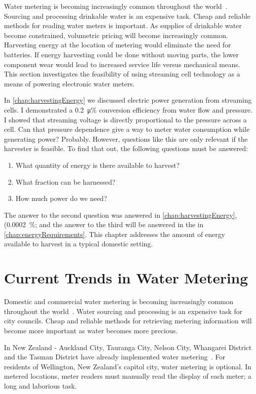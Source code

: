 
Water metering is becoming increasingly common throughout the world~\cite{Chang2012}.
Sourcing and processing drinkable water is an expensive task.
Cheap and reliable methods for reading water meters is important.
As supplies of drinkable water become constrained, volumetric pricing will become increasingly common.
Harvesting energy at the location of metering would eliminate the need for batteries.
If energy harvesting could be done without moving parts, the lower component wear would lead to increased service life versus mechanical means.
This section investigates the feasibility of using streaming cell technology as a means of powering electronic water meters.

In \cref{chap:harvestingEnergy} we discussed electric power generation from streaming cells.
I demonstrated a \SI{0.2}{\micro\percent} conversion efficiency from water flow and pressure.
I showed that streaming voltage is directly proportional to the pressure across a cell.
Can that pressure dependence give a way to meter water consumption while generating power? Probably.
However, questions like this are only relevant if the harvester is feasible.
To find that out, the following questions must be answered:
\begin{enumerate}
  \item What quantity of energy is there available to harvest?
  \item What fraction can be harnessed?
  \item How much power do we need?
\end{enumerate}
The answer to the second question was answered in \cref{chap:harvestingEnergy}, (\SI{0.0002}{\percent}; and the answer to the third will be answered in the in \cref{chap:energyRequirements}.
This chapter addresses the amount of energy available to harvest in a typical domestic setting.


\section{Current Trends in Water Metering}
  Domestic and commercial water metering is becoming increasingly common throughout the world~\cite{Chang2012}.
  Water sourcing and processing is an expensive task for city councils.
  Cheap and reliable methods for retrieving metering information will become more important as water becomes more precious.

  In New Zealand - Auckland City, Tauranga City, Nelson City, Whangarei District and the Tasman District have already implemented water metering~\cite{WaterNewZealand2011}.
  For residents of Wellington, New Zealand's capitol city, water metering is optional.
  In metered locations, meter readers must manually read the display of each meter; a long and laborious task.
  
